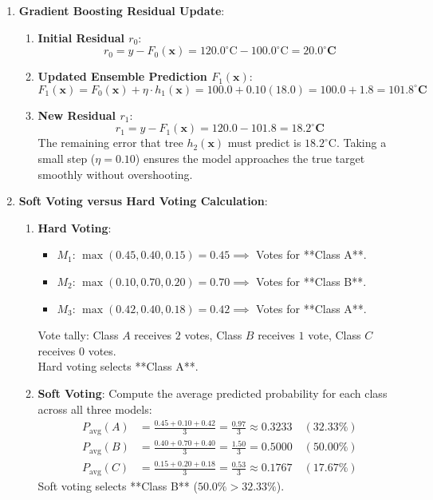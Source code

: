 \begin{enumerate}
    \item \textbf{Gradient Boosting Residual Update}:
    \begin{enumerate}[label=(\alph*)]
        \item \textbf{Initial Residual $r_0$}:
        \begin{equation*}
        r_0 = y - F_0(\mathbf{x}) = 120.0^\circ\text{C} - 100.0^\circ\text{C} = \mathbf{20.0^\circ\text{C}}
        \end{equation*}
        \item \textbf{Updated Ensemble Prediction $F_1(\mathbf{x})$}:
        \begin{equation*}
        F_1(\mathbf{x}) = F_0(\mathbf{x}) + \eta \cdot h_1(\mathbf{x}) = 100.0 + 0.10(18.0) = 100.0 + 1.8 = \mathbf{101.8^\circ\text{C}}
        \end{equation*}
        \item \textbf{New Residual $r_1$}:
        \begin{equation*}
        r_1 = y - F_1(\mathbf{x}) = 120.0 - 101.8 = \mathbf{18.2^\circ\text{C}}
        \end{equation*}
        The remaining error that tree $h_2(\mathbf{x})$ must predict is $18.2^\circ\text{C}$. Taking a small step ($\eta = 0.10$) ensures the model approaches the true target smoothly without overshooting.
    \end{enumerate}

    \item \textbf{Soft Voting versus Hard Voting Calculation}:
    \begin{enumerate}[label=(\alph*)]
        \item \textbf{Hard Voting}:
        \begin{itemize}
            \item $M_1$: $\max(0.45, 0.40, 0.15) = 0.45 \implies$ Votes for **Class A**.
            \item $M_2$: $\max(0.10, 0.70, 0.20) = 0.70 \implies$ Votes for **Class B**.
            \item $M_3$: $\max(0.42, 0.40, 0.18) = 0.42 \implies$ Votes for **Class A**.
        \end{itemize}
        Vote tally: Class $A$ receives $2$ votes, Class $B$ receives $1$ vote, Class $C$ receives $0$ votes. \\
        Hard voting selects **Class A**.

        \item \textbf{Soft Voting}:
        Compute the average predicted probability for each class across all three models:
        \begin{align*}
        P_{\text{avg}}(A) &= \frac{0.45 + 0.10 + 0.42}{3} = \frac{0.97}{3} \approx \mathbf{0.3233} \quad (32.33\%) \\
        P_{\text{avg}}(B) &= \frac{0.40 + 0.70 + 0.40}{3} = \frac{1.50}{3} = \mathbf{0.5000} \quad (\mathbf{50.00\%}) \\
        P_{\text{avg}}(C) &= \frac{0.15 + 0.20 + 0.18}{3} = \frac{0.53}{3} \approx \mathbf{0.1767} \quad (17.67\%)
        \end{align*}
        Soft voting selects **Class B** ($50.0\% > 32.33\%$).


\end{enumerate}
\end{enumerate}
